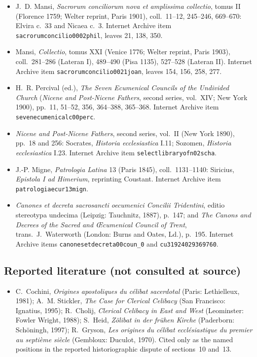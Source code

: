 \begin{itemize}
\item J.~D. Mansi, \emph{Sacrorum conciliorum nova et amplissima collectio}, tomus II (Florence 1759; Welter reprint, Paris 1901), coll.~11--12, 245--246, 669--670: Elvira c.~33 and Nicaea c.~3. Internet Archive item \texttt{sacrorumconcilio0002phil}, leaves 21, 138, 350.
\item Mansi, \emph{Collectio}, tomus XXI (Venice 1776; Welter reprint, Paris 1903), coll.~281--286 (Lateran I), 489--490 (Pisa 1135), 527--528 (Lateran II). Internet Archive item \texttt{sacrorumconcilio0021joan}, leaves 154, 156, 258, 277.
\item H.~R. Percival (ed.), \emph{The Seven Ecumenical Councils of the Undivided Church} (\emph{Nicene and Post-Nicene Fathers}, second series, vol.~XIV; New York 1900), pp.~11, 51--52, 356, 364--388, 365--368. Internet Archive item \texttt{sevenecumenicalc00perc}.
\item \emph{Nicene and Post-Nicene Fathers}, second series, vol.~II (New York 1890), pp.~18 and 256: Socrates, \emph{Historia ecclesiastica} I.11; Sozomen, \emph{Historia ecclesiastica} I.23. Internet Archive item \texttt{selectlibraryofn02scha}.
\item J.-P. Migne, \emph{Patrologia Latina} 13 (Paris 1845), coll.~1131--1140: Siricius, \emph{Epistola I ad Himerium}, reprinting Coustant. Internet Archive item \texttt{patrologiaecur13mign}.
\item \emph{Canones et decreta sacrosancti oecumenici Concilii Tridentini}, editio stereotypa undecima (Leipzig: Tauchnitz, 1887), p.~147; and \emph{The Canons and Decrees of the Sacred and Œcumenical Council of Trent}, trans.\ J.~Waterworth (London: Burns and Oates, Ld.), p.~195. Internet Archive items \texttt{canonesetdecreta00coun\_0} and \texttt{cu31924029369760}.
\end{itemize}

\subsection*{Reported literature (not consulted at source)}

\begin{itemize}
\item C.~Cochini, \emph{Origines apostoliques du célibat sacerdotal} (Paris: Lethielleux, 1981); A.~M. Stickler, \emph{The Case for Clerical Celibacy} (San Francisco: Ignatius, 1995); R.~Cholij, \emph{Clerical Celibacy in East and West} (Leominster: Fowler Wright, 1988); S.~Heid, \emph{Zölibat in der frühen Kirche} (Paderborn: Schöningh, 1997); R.~Gryson, \emph{Les origines du célibat ecclésiastique du premier au septième siècle} (Gembloux: Duculot, 1970). Cited only as the named positions in the reported historiographic dispute of sections~10 and~13.
\end{itemize}
\endgroup
